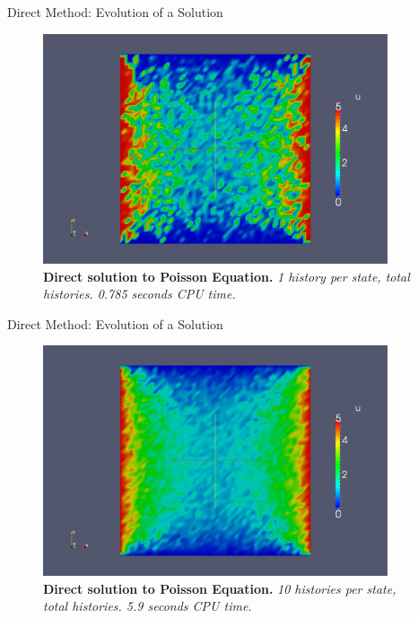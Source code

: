 \documentclass{beamer}
\begin{document}
\begin{frame}{Direct Method: Evolution of a Solution}

  \begin{figure}[h!]
    \begin{center}
      \includegraphics[width=4in]{direct_1.png}
    \end{center}
    \caption{\textbf{Direct solution to Poisson Equation.} \textit{1
        history per state,  total histories. 0.785 seconds
        CPU time.} }
  \end{figure}

\end{frame}

\begin{frame}{Direct Method: Evolution of a Solution}

  \begin{figure}[h!]
    \begin{center}
      \includegraphics[width=4in]{direct_10.png}
    \end{center}
    \caption{\textbf{Direct solution to Poisson Equation.} \textit{10
        histories per state,  total histories. 5.9 seconds
        CPU time.} }
  \end{figure}

\end{frame}
\end{document}

